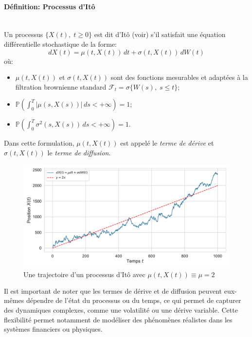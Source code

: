 \paragraph{Définition: Processus d'Itô}\mbox{}\\
Un processus $\{X(t),\;t \geq 0\}$ est dit d'Itô (voir\cite{ito1944}) s'il satisfait une équation différentielle stochastique de la forme:
\begin{equation}
    dX(t) = \mu(t, X(t))\,dt + \sigma(t, X(t))\,dW(t)
\end{equation}\label{ito_eq}
où:
\begin{itemize}
    \item $\mu(t, X(t))$ et $\sigma(t, X(t))$ sont des fonctions mesurables et adaptées à la filtration brownienne standard $\mathcal{F}_t=\sigma\{W(s),\;s\leq t\}$;
    \item $\mathbb{P}\left( \int_0^T |\mu(s, X(s))|\,ds < +\infty \right) = 1$;
    \item $\mathbb{P}\left( \int_0^T \sigma^2(s, X(s))\,ds < +\infty \right) = 1$.
\end{itemize}
Dans cette formulation, $\mu(t, X(t))$ est appelé le \textit{terme de dérive} et $\sigma(t, X(t))$ le \textit{terme de diffusion}.

\begin{figure}[htb]
    \centering
    \includegraphics[width=\linewidth]{img/intro/path_drift.pdf}
    \caption{Une trajectoire d'un processus d'Itô avec $\mu(t, X(t)) \equiv \mu = 2$}\label{fig:TrajIto}
\end{figure}
\FloatBarrier

Il est important de noter que les termes de dérive et de diffusion peuvent eux-mêmes dépendre de l'état du processus ou du temps, ce qui permet de capturer des dynamiques complexes, comme une volatilité ou une dérive variable. Cette flexibilité permet notamment de modéliser des phénomènes réalistes dans les systèmes financiers ou physiques.

